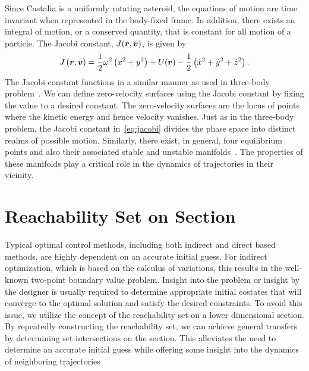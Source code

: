 \documentclass[]{aiaa-tc}%
\begin{document}
Since Castalia is a uniformly rotating asteroid, the equations of motion are time invariant when represented in the body-fixed frame.
In addition, there exists an integral of motion, or a conserved quantity, that is constant for all motion of a particle.
The Jacobi constant, \( J (\bm{r} , \bm{v} ) \), is given by
\begin{align}\label{eq:jacobi}
    J \left( \bm{r}, \bm{v} \right) = \frac{1}{2} \omega^2 \left( x^2 + y^2 \right) + U(\bm{r}) - \frac{1}{2} \left( \dot{x}^2 + \dot{y}^2 + \dot{z}^2 \right) .
\end{align}
The Jacobi constant functions in a similar manner as used in three-body problem~\cite{szebehely1967}.
We can define zero-velocity surfaces using the Jacobi constant by fixing the value to a desired constant.
The zero-velocity surfaces are the locus of points where the kinetic energy and hence velocity vanishes.
Just as in the three-body problem, the Jacobi constant in~\cref{eq:jacobi} divides the phase space into distinct realms of possible motion.
Similarly, there exist, in general, four equilibrium points and also their associated stable and unstable manifolds~\cite{scheeres1996,scheeres1994}.
The properties of these manifolds play a critical role in the dynamics of trajectories in their vicinity.

\section{Reachability Set on \Poincare Section}\label{sec:reachability}

Typical optimal control methods, including both indirect and direct based methods, are highly dependent on an accurate initial guess.
For indirect optimization, which is based on the calculus of variations, this results in the well-known two-point boundary value problem.
Insight into the problem or insight by the designer is usually required to determine appropriate initial costates that will converge to the optimal solution and satisfy the desired constraints.
To avoid this issue, we utilize the concept of the reachability set on a lower dimensional \Poincare section.
By repeatedly constructing the reachability set, we can achieve general transfers by determining set intersections on the \Poincare section.
This alleviates the need to determine an accurate initial guess while offering some insight into the dynamics of neighboring trajectories
\end{document}
